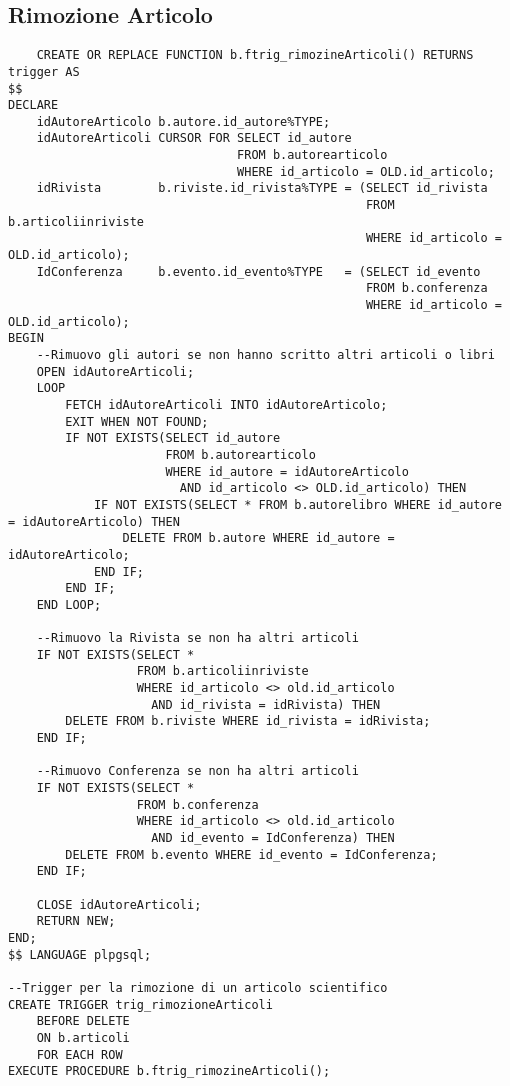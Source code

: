 \subsection{Rimozione Articolo}
\begin{lstlisting}
    CREATE OR REPLACE FUNCTION b.ftrig_rimozineArticoli() RETURNS trigger AS
$$
DECLARE
    idAutoreArticolo b.autore.id_autore%TYPE;
    idAutoreArticoli CURSOR FOR SELECT id_autore
                                FROM b.autorearticolo
                                WHERE id_articolo = OLD.id_articolo;
    idRivista        b.riviste.id_rivista%TYPE = (SELECT id_rivista
                                                  FROM b.articoliinriviste
                                                  WHERE id_articolo = OLD.id_articolo);
    IdConferenza     b.evento.id_evento%TYPE   = (SELECT id_evento
                                                  FROM b.conferenza
                                                  WHERE id_articolo = OLD.id_articolo);
BEGIN
    --Rimuovo gli autori se non hanno scritto altri articoli o libri
    OPEN idAutoreArticoli;
    LOOP
        FETCH idAutoreArticoli INTO idAutoreArticolo;
        EXIT WHEN NOT FOUND;
        IF NOT EXISTS(SELECT id_autore
                      FROM b.autorearticolo
                      WHERE id_autore = idAutoreArticolo
                        AND id_articolo <> OLD.id_articolo) THEN
            IF NOT EXISTS(SELECT * FROM b.autorelibro WHERE id_autore = idAutoreArticolo) THEN
                DELETE FROM b.autore WHERE id_autore = idAutoreArticolo;
            END IF;
        END IF;
    END LOOP;

    --Rimuovo la Rivista se non ha altri articoli
    IF NOT EXISTS(SELECT *
                  FROM b.articoliinriviste
                  WHERE id_articolo <> old.id_articolo
                    AND id_rivista = idRivista) THEN
        DELETE FROM b.riviste WHERE id_rivista = idRivista;
    END IF;

    --Rimuovo Conferenza se non ha altri articoli
    IF NOT EXISTS(SELECT *
                  FROM b.conferenza
                  WHERE id_articolo <> old.id_articolo
                    AND id_evento = IdConferenza) THEN
        DELETE FROM b.evento WHERE id_evento = IdConferenza;
    END IF;

    CLOSE idAutoreArticoli;
    RETURN NEW;
END;
$$ LANGUAGE plpgsql;

--Trigger per la rimozione di un articolo scientifico
CREATE TRIGGER trig_rimozioneArticoli
    BEFORE DELETE
    ON b.articoli
    FOR EACH ROW
EXECUTE PROCEDURE b.ftrig_rimozineArticoli();
\end{lstlisting}

